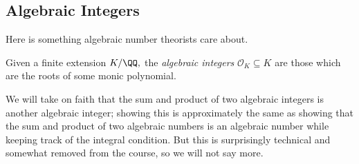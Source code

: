 \documentclass[../notes.tex]{subfiles}
\begin{document}
\subsection{Algebraic Integers}
Here is something algebraic number theorists care about.
\begin{definition}
	Given a finite extension $K/\QQ,$ the \textit{algebraic integers} $\mathcal O_K\subseteq K$ are those which are the roots of some monic polynomial.
\end{definition}
We will take on faith that the sum and product of two algebraic integers is another algebraic integer; showing this is approximately the same as showing that the sum and product of two algebraic numbers is an algebraic number while keeping track of the integral condition. But this is surprisingly technical and somewhat removed from the course, so we will not say more.
\end{document}
